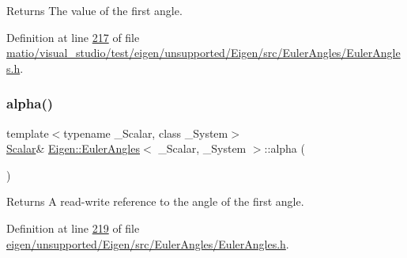 \begin{DoxyReturn}{Returns}
The value of the first angle. 
\end{DoxyReturn}


Definition at line \hyperlink{matio_2visual__studio_2test_2eigen_2unsupported_2_eigen_2src_2_euler_angles_2_euler_angles_8h_source_l00217}{217} of file \hyperlink{matio_2visual__studio_2test_2eigen_2unsupported_2_eigen_2src_2_euler_angles_2_euler_angles_8h_source}{matio/visual\+\_\+studio/test/eigen/unsupported/\+Eigen/src/\+Euler\+Angles/\+Euler\+Angles.\+h}.

\mbox{\label{class_eigen_1_1_euler_angles_a69942a5a9b0c3670e7f2797e84cbde8c}} 
\subsubsection{\texorpdfstring{alpha()}{alpha()}\hspace{0.1cm}{\footnotesize\ttfamily [3/4]}}
{\footnotesize\ttfamily template$<$typename \+\_\+\+Scalar, class \+\_\+\+System$>$ \\
\hyperlink{class_eigen_1_1_euler_angles_a2ab1d433ac9683268446f8905ac31aac}{Scalar}\& \hyperlink{class_eigen_1_1_euler_angles}{Eigen\+::\+Euler\+Angles}$<$ \+\_\+\+Scalar, \+\_\+\+System $>$\+::alpha (\begin{DoxyParamCaption}{ }\end{DoxyParamCaption})\hspace{0.3cm}{\ttfamily [inline]}}

\begin{DoxyReturn}{Returns}
A read-\/write reference to the angle of the first angle. 
\end{DoxyReturn}


Definition at line \hyperlink{eigen_2unsupported_2_eigen_2src_2_euler_angles_2_euler_angles_8h_source_l00219}{219} of file \hyperlink{eigen_2unsupported_2_eigen_2src_2_euler_angles_2_euler_angles_8h_source}{eigen/unsupported/\+Eigen/src/\+Euler\+Angles/\+Euler\+Angles.\+h}.

\mbox{\label{class_eigen_1_1_euler_angles_a69942a5a9b0c3670e7f2797e84cbde8c}} 
